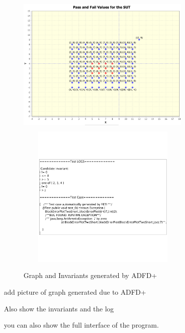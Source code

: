 \documentclass[runningheads,a4paper]{llncs}
\begin{document}
\begin{figure}[ht]
\centering
\includegraphics[width= 8.5cm,height=7cm]{adfdPlusGraph.png}
\includegraphics[width= 8.5cm,height=7cm]{adfdPlusInvariants.png}
\caption{Graph and Invariants generated by ADFD+}
\label{fig:ADFD+}
\end{figure}


add picture of graph generated due to ADFD+

Also show the invariants and the log

you can also show the full interface of the program.
\end{document}
